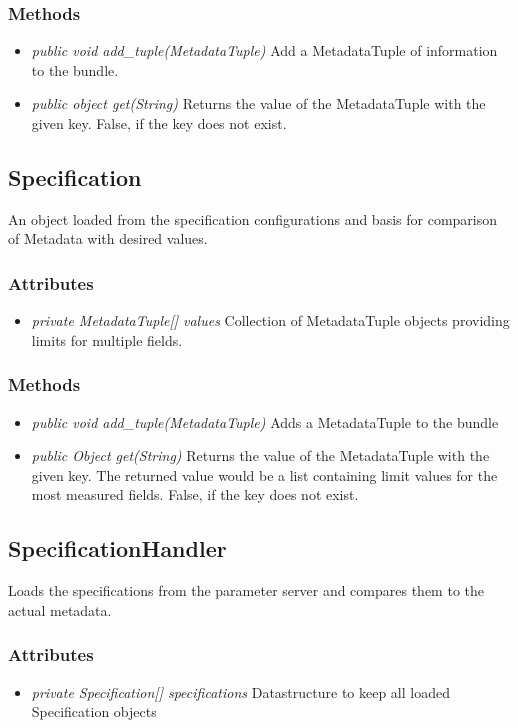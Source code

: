 \subsubsection{Methods}
\begin{itemize}
	\item \textit{public void add\_tuple(MetadataTuple)}
	Add a MetadataTuple of information to the bundle.
	\item \textit{public object get(String)}
	Returns the value of the MetadataTuple with the given key. False, if the key does not exist.
\end{itemize}


\subsection{Specification}
An object loaded from the specification configurations and basis for comparison of Metadata with desired values.

\subsubsection{Attributes}
\begin{itemize}
	\item \textit{private MetadataTuple[] values}
	Collection of MetadataTuple objects providing limits for multiple fields.
\end{itemize}
\subsubsection{Methods}
\begin{itemize}
	\item \textit{public void add\_tuple(MetadataTuple)}
	Adds a MetadataTuple to the bundle
	\item \textit{public Object get(String)}
	Returns the value of the MetadataTuple with the given key. The returned value would be a list containing limit values for the most measured fields. False, if the key does not exist.
\end{itemize}


\subsection{SpecificationHandler}
Loads the specifications from the parameter server and compares them to the actual metadata.

\subsubsection{Attributes}
\begin{itemize}
	\item \textit{private Specification[] specifications}
	Datastructure to keep all loaded Specification objects
\end{itemize}

